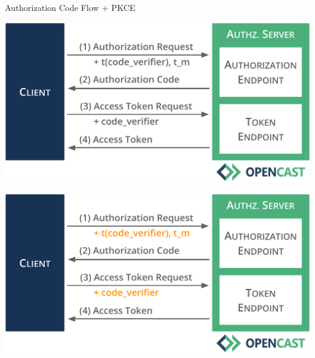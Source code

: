 \documentclass[aspectratio=169]{beamer}
\begin{document}
\begin{frame}{Authorization Code Flow + PKCE}
	\vspace*{0.5em}
	\begin{overprint}
		\centerline{\includegraphics[height=0.7\textheight]{figures/pkce-01}}
		\centerline{\includegraphics[height=0.7\textheight]{figures/pkce-02}}
	\end{overprint}
	\vspace*{0.5em}
	\vspace*{-1em}
\end{frame}
\end{document}
